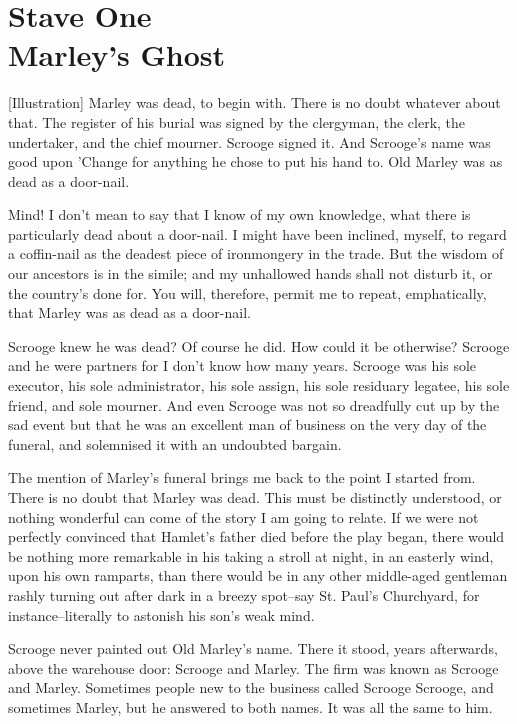 \chapter{Stave One\\Marley's Ghost}

[Illustration]
Marley was dead, to begin with. There is no doubt whatever about that.
The register of his burial was signed by the clergyman, the clerk, the
undertaker, and the chief mourner. Scrooge signed it. And Scrooge's name
was good upon 'Change for anything he chose to put his hand to. Old
Marley was as dead as a door-nail.

Mind! I don't mean to say that I know of my own knowledge, what there is
particularly dead about a door-nail. I might have been inclined, myself,
to regard a coffin-nail as the deadest piece of ironmongery in the
trade. But the wisdom of our ancestors is in the simile; and my
unhallowed hands shall not disturb it, or the country's done for. You
will, therefore, permit me to repeat, emphatically, that Marley was as
dead as a door-nail.

Scrooge knew he was dead? Of course he did. How could it be otherwise?
Scrooge and he were partners for I don't know how many years. Scrooge
was his sole executor, his sole administrator, his sole assign, his sole
residuary legatee, his sole friend, and sole mourner. And even Scrooge
was not so dreadfully cut up by the sad event but that he was an
excellent man of business on the very day of the funeral, and solemnised
it with an undoubted bargain.

The mention of Marley's funeral brings me back to the point I started
from. There is no doubt that Marley was dead. This must be distinctly
understood, or nothing wonderful can come of the story I am going to
relate. If we were not perfectly convinced that Hamlet's father died
before the play began, there would be nothing more remarkable in his
taking a stroll at night, in an easterly wind, upon his own ramparts,
than there would be in any other middle-aged gentleman rashly turning
out after dark in a breezy spot--say St. Paul's Churchyard, for
instance--literally to astonish his son's weak mind.

Scrooge never painted out Old Marley's name. There it stood, years
afterwards, above the warehouse door: Scrooge and Marley. The firm was
known as Scrooge and Marley. Sometimes people new to the business called
Scrooge Scrooge, and sometimes Marley, but he answered to both names. It
was all the same to him.

